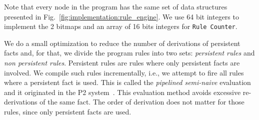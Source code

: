Note that every node in the program has the same set of data structures
presented in Fig.~\ref{fig:implementation:rule_engine}. We use 64 bit integers
to implement the 2 bitmaps and an array of 16 bits integers for \texttt{Rule
Counter}.

We do a small optimization to reduce the number of derivations of persistent
facts and, for that, we divide the program rules into two sets: \emph{persistent
rules} and \emph{non persistent rules}. Persistent rules are rules where only
persistent facts are involved. We compile such rules incrementally, i.e., we
attempt to fire all rules where a persistent fact is used. This is called the
\emph{pipelined semi-naive} evaluation and it originated in the P2
system~\cite{Loo-condie-garofalakis-p2}. This evaluation method avoids excessive
re-derivations of the same fact. The order of derivation does not matter for
those rules, since only persistent facts are used.

